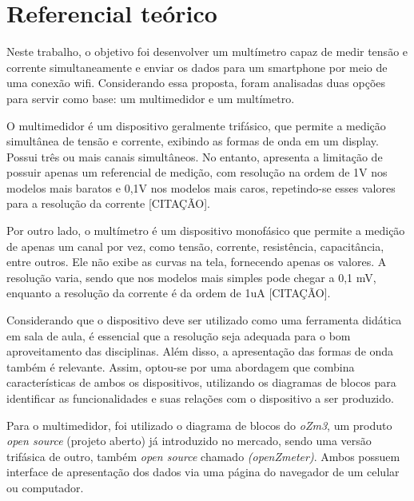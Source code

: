 \chapter{Referencial te\'orico}\label{cap:referencialTeorico}

Neste trabalho, o objetivo foi desenvolver um multímetro capaz de medir tensão e corrente simultaneamente e enviar os dados para um smartphone por meio de uma conexão wifi. Considerando essa proposta, foram analisadas duas opções para servir como base: um multimedidor e um multímetro.

O multimedidor é um dispositivo geralmente trifásico, que permite a medição simultânea de tensão e corrente, exibindo as formas de onda em um display. Possui três ou mais canais simultâneos. No entanto, apresenta a limitação de possuir apenas um referencial de medição, com resolução na ordem de 1V nos modelos mais baratos e 0,1V nos modelos mais caros, repetindo-se esses valores para a resolução da corrente [CITAÇÃO].

Por outro lado, o multímetro é um dispositivo monofásico que permite a medição de apenas um canal por vez, como tensão, corrente, resistência, capacitância, entre outros. Ele não exibe as curvas na tela, fornecendo apenas os valores. A resolução varia, sendo que nos modelos mais simples pode chegar a 0,1 mV, enquanto a resolução da corrente é da ordem de 1uA [CITAÇÃO].

Considerando que o dispositivo deve ser utilizado como uma ferramenta didática em sala de aula, é essencial que a resolução seja adequada para o bom aproveitamento das disciplinas. Além disso, a apresentação das formas de onda também é relevante. Assim, optou-se por uma abordagem que combina características de ambos os dispositivos, utilizando os diagramas de blocos para identificar as funcionalidades e suas relações com o dispositivo a ser produzido.

Para o multimedidor, foi utilizado o diagrama de blocos do \textit{oZm3}, um produto \textit{open source} (projeto aberto) já introduzido no mercado, sendo uma versão trifásica de outro, também \textit{open source} chamado \textit{(openZmeter)}. Ambos possuem interface de apresentação dos dados via uma página do navegador de um celular ou computador.

